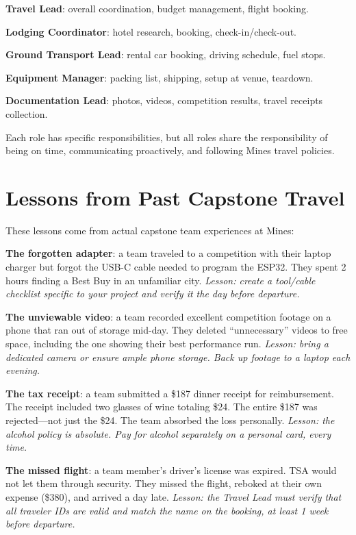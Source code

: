 \textbf{Travel Lead}: overall coordination, budget management, flight booking.

\textbf{Lodging Coordinator}: hotel research, booking, check-in/check-out.

\textbf{Ground Transport Lead}: rental car booking, driving schedule, fuel stops.

\textbf{Equipment Manager}: packing list, shipping, setup at venue, teardown.

\textbf{Documentation Lead}: photos, videos, competition results, travel receipts collection.

Each role has specific responsibilities, but all roles share the responsibility of being on time, communicating proactively, and following Mines travel policies.



\section{Lessons from Past Capstone Travel}
These lessons come from actual capstone team experiences at Mines:

\textbf{The forgotten adapter}: a team traveled to a competition with their laptop charger but forgot the USB-C cable needed to program the ESP32. They spent 2 hours finding a Best Buy in an unfamiliar city. \emph{Lesson: create a tool/cable checklist specific to your project and verify it the day before departure.}

\textbf{The unviewable video}: a team recorded excellent competition footage on a phone that ran out of storage mid-day. They deleted ``unnecessary'' videos to free space, including the one showing their best performance run. \emph{Lesson: bring a dedicated camera or ensure ample phone storage. Back up footage to a laptop each evening.}

\textbf{The tax receipt}: a team submitted a \$187 dinner receipt for reimbursement. The receipt included two glasses of wine totaling \$24. The entire \$187 was rejected---not just the \$24. The team absorbed the loss personally. \emph{Lesson: the alcohol policy is absolute. Pay for alcohol separately on a personal card, every time.}

\textbf{The missed flight}: a team member's driver's license was expired. TSA would not let them through security. They missed the flight, reboked at their own expense (\$380), and arrived a day late. \emph{Lesson: the Travel Lead must verify that all traveler IDs are valid and match the name on the booking, at least 1 week before departure.}

